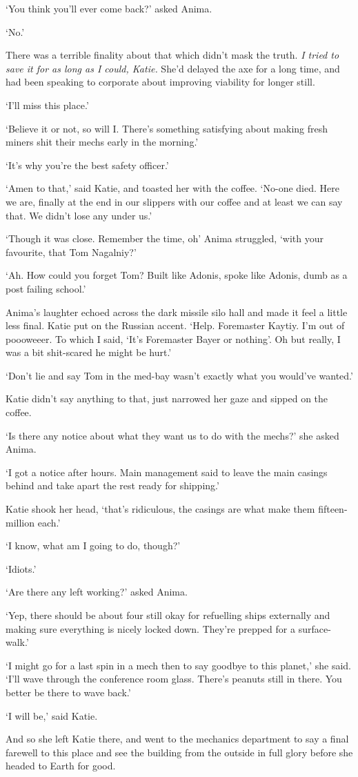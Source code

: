 `You think you'll ever come back?' asked Anima.

`No.'

There was a terrible finality about that which didn't mask the
truth. \textit{I tried to save it for as long as I could, Katie.}
She'd delayed the axe for a long time, and had been speaking to
corporate about improving viability for longer still.

`I'll miss this place.'

`Believe it or not, so will I. There's something satisfying about
making fresh miners shit their mechs early in the morning.'

`It's why you're the best safety officer.'

`Amen to that,' said Katie, and toasted her with the coffee. `No-one
died. Here we are, finally at the end in our slippers with our coffee
and at least we can say that. We didn't lose any under us.'

`Though it was close. Remember the time, oh' Anima struggled, `with
your favourite, that Tom Nagalniy?'

`Ah. How could you forget Tom? Built like Adonis, spoke like Adonis,
dumb as a post failing school.'

Anima's laughter echoed across the dark missile silo hall and made it
feel a little less final. Katie put on the Russian
accent. `Help. Foremaster Kaytiy. I'm out of poooweeer. To which I
said, ‘It's Foremaster Bayer or nothing'. Oh but really, I was a bit
shit-scared he might be hurt.'

`Don't lie and say Tom in the med-bay wasn't exactly what you would've
wanted.'

Katie didn't say anything to that, just narrowed her gaze and sipped
on the coffee.

`Is there any notice about what they want us to do with the mechs?'
she asked Anima.

`I got a notice after hours. Main management said to leave the main
casings behind and take apart the rest ready for shipping.'

Katie shook her head, `that's ridiculous, the casings are what make
them fifteen-million each.'

`I know, what am I going to do, though?'

`Idiots.'

`Are there any left working?' asked Anima.

`Yep, there should be about four still okay for refuelling ships
externally and making sure everything is nicely locked down. They're
prepped for a surface-walk.'

`I might go for a last spin in a mech then to say goodbye to this
planet,' she said. `I'll wave through the conference room
glass. There's peanuts still in there. You better be there to wave
back.'

`I will be,' said Katie.

And so she left Katie there, and went to the mechanics department to
say a final farewell to this place and see the building from the
outside in full glory before she headed to Earth for good.
